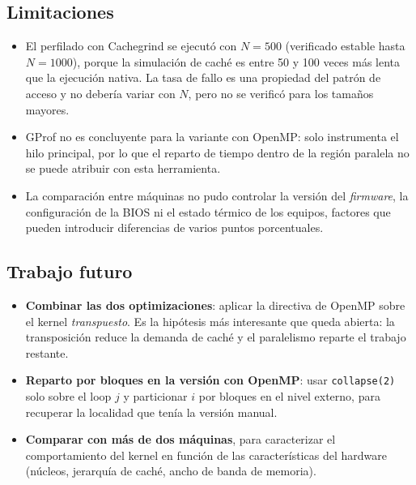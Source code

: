 \subsection{Limitaciones}

\begin{itemize}
    \item El perfilado con Cachegrind se ejecutó con $N=500$ (verificado estable hasta $N=1000$), porque la simulación de caché es entre 50 y 100 veces más lenta que la ejecución nativa. La tasa de fallo es una propiedad del patrón de acceso y no debería variar con $N$, pero no se verificó para los tamaños mayores.
    \item GProf no es concluyente para la variante con OpenMP: solo instrumenta el hilo principal, por lo que el reparto de tiempo dentro de la región paralela no se puede atribuir con esta herramienta.
    \item La comparación entre máquinas no pudo controlar la versión del \emph{firmware}, la configuración de la BIOS ni el estado térmico de los equipos, factores que pueden introducir diferencias de varios puntos porcentuales.
\end{itemize}

\subsection{Trabajo futuro}

\begin{itemize}
    \item \textbf{Combinar las dos optimizaciones}: aplicar la directiva de OpenMP sobre el kernel \emph{transpuesto}. Es la hipótesis más interesante que queda abierta: la transposición reduce la demanda de caché y el paralelismo reparte el trabajo restante.
    \item \textbf{Reparto por bloques en la versión con OpenMP}: usar \texttt{collapse(2)} solo sobre el loop $j$ y particionar $i$ por bloques en el nivel externo, para recuperar la localidad que tenía la versión manual.
    \item \textbf{Comparar con más de dos máquinas}, para caracterizar el comportamiento del kernel en función de las características del hardware (núcleos, jerarquía de caché, ancho de banda de memoria).
\end{itemize}
